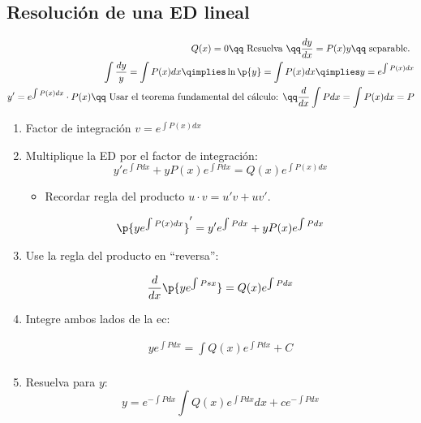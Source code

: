 \subsection{Resolución de una ED lineal}
\begin{center}
    \begin{align*}
        Q(x)=0 \qq \text{ Resuelva } \qq \frac{d y}{d x} = P(x)y \qq \text{ separable. } \\ 
        \int \frac{d y}{y} = \int P(x)dx \qimplies \ln\p{ y } =\int P(x)dx \qimplies y=e^{\int P(x)dx} \\ 
        y' = e^{\int P(x)dx} \cdot P(x) \qq \text{ Usar el teorema fundamental del cálculo: } \qq \frac{d }{d x} \int P dx = \int P(x) dx =P \\ 
    \end{align*}
\end{center}
\begin{enumerate}
    \item Factor de integración $\displaystyle v=e^{\int P(x)dx}$ 
    \item Multiplique la ED por el factor de integración:
        \[
            y'e^{\int P dx} + y P(x) e^{\int P dx} = Q(x)e^{\int P(x)dx}
        \]
        \begin{itemize}
            \item Recordar regla del producto $\displaystyle u\cdot v = u'v + uv'$.
        \end{itemize}
        \begin{center}
            \begin{align*}
                \p{ye^{\int P(x)dx}}' = y'e^{\int P dx}  + yP(x)e^{\int P dx} \\ 
            \end{align*}
        \end{center}
    
    \item Use la regla del producto en ``reversa'':
        \begin{center}
           \begin{align*}
               \frac{d }{d x} \p{ye^{\int P sx}} = Q(x)e^{\int P dx} \\ 
           \end{align*}
        \end{center}
    
    \item Integre ambos lados de la ec:
        \begin{center}
           \begin{align*}
               y e^{\int P dx} = \int Q(x)e^{\int Pdx} + C \\ 
           \end{align*}
        \end{center}
    
    \item Resuelva para $y$:
        \[
          y = e^{-\int Pdx}\int Q(x)e^{\int Pdx}dx + ce^{-\int Pdx} 
        \]
\end{enumerate}

